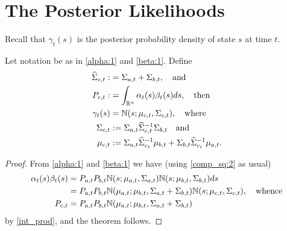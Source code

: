 \documentclass[12pt,leqno]{article}
\begin{document}
\section{The Posterior Likelihoods}
Recall that $\gamma_t(s)$ is the posterior probability density of state $s$
at time $t$. 
\begin{Thm}
  Let notation be as in \eqref{alpha:1} and \eqref{beta:1}.  Define
\begin{align*}
  \widehat{\Sigma}_{c,t} :&= \Sigma_{a,t}+\Sigma_{b,t}, \quad\text{and}\\
  P_{c,t} :&= \int_{{\mathbb R}^n}\alpha_t(s)\beta_t(s)ds,\quad\text{then} \\
      \gamma_t(s) &= {\mathbb N}(s;\mu_{c,t},\Sigma_{c,t}),\quad\text{where}\\
      \Sigma_{c,t} &:= \Sigma_{a,t}\widehat{\Sigma}_{c,t}^{-1}\Sigma_{b,t}
      \quad\text{and}\\
      \mu_{c,t} &:= \Sigma_{a,t}\widehat{\Sigma}_{c_t}^{-1}\mu_{b,t} +
      \Sigma_{b,t}\widehat{\Sigma}_{c_t}^{-1}\mu_{a,t}.
  \end{align*}
\end{Thm}
\begin{proof}
  From \eqref{alpha:1} and \eqref{beta:1} we have (using \eqref{comp_sq:2}
  as usual)
  \begin{align*}
  \alpha_t(s)\beta_t(s) &= P_{a,t}P_{b,t}{\mathbb N}(s;\mu_{a,t},\Sigma_{a,t})
  {\mathbb N}(s;\mu_{b,t},\Sigma_{b,t})ds\\
  &= P_{a,t}P_{b,t}{\mathbb N}(\mu_{a,t};\mu_{b,t},\Sigma_{a,t}+\Sigma_{b,t}){\mathbb N}(s;\mu_{c,t},
  \Sigma_{c,t}), \quad\text{whence}\\
  P_{c,t} &= P_{a,t}P_{b,t}{\mathbb N}(\mu_{a,t};\mu_{b,t},\Sigma_{a,t}+\Sigma_{b,t})
  \end{align*}
by \eqref{int_prod}, and the theorem follows.
\end{proof}
\end{document}
